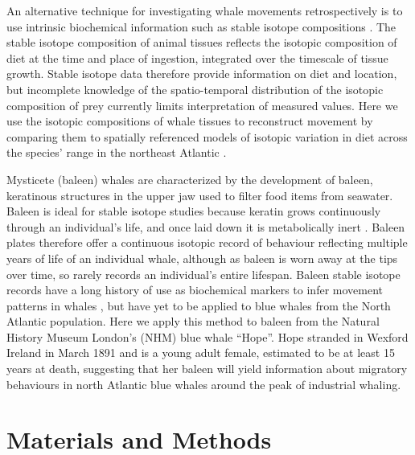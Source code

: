\documentclass[a4paper,12pt]{article}
\begin{document}
An alternative technique for investigating whale movements retrospectively is to use intrinsic biochemical information such as stable isotope compositions \cite{west2006stable,busquets2017estimating,hobson2008tracking}. 
The stable isotope composition of animal tissues reflects the isotopic composition of diet at the time and place of ingestion, integrated over the timescale of tissue growth. 
Stable isotope data therefore provide information on diet and location, but incomplete knowledge of the spatio-temporal distribution of the isotopic composition of prey currently limits interpretation of measured values. 
Here we use the isotopic compositions of whale tissues to reconstruct movement by comparing them to spatially referenced models of isotopic variation in diet across the species' range in the northeast Atlantic \cite{hobson2008tracking,eisenmann2016isotopic}.

Mysticete (baleen) whales are characterized by the development of baleen, keratinous structures in the upper jaw used to filter food items from seawater. 
Baleen is ideal for stable isotope studies because keratin grows continuously through an individual's life, and once laid down it is metabolically inert \cite{best1996stable,hobson1998stable}. 
Baleen plates therefore offer a continuous isotopic record of behaviour reflecting multiple years of life of an individual whale, although as baleen is worn away at the tips over time, so rarely records an individual's entire lifespan. 
Baleen stable isotope records have a long history of use as biochemical markers to infer movement patterns in whales \cite{ryan2013stable,best1996stable,hobson1998stable,hobson2008tracking}, but have yet to be applied to blue whales from the North Atlantic population. 
Here we apply this method to baleen from the Natural History Museum London's (NHM) blue whale ``Hope''. 
Hope stranded in Wexford Ireland in March 1891 and is a young adult female, estimated to be at least 15 years at death, suggesting that her baleen will yield information about migratory behaviours in north Atlantic blue whales around the peak of industrial whaling.

\section{Materials and Methods}
\end{document}
